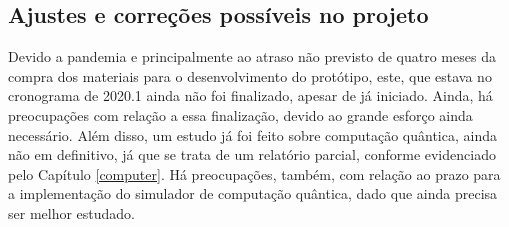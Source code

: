 \subsection{Ajustes e correções possíveis no projeto}
Devido a pandemia e principalmente ao atraso não previsto de quatro meses da compra dos materiais para o desenvolvimento do protótipo, este, que estava no cronograma de 2020.1 ainda não foi finalizado, apesar de já iniciado. Ainda, há preocupações com relação a essa finalização, devido ao grande esforço ainda necessário.
Além disso, um estudo já foi feito sobre computação quântica, ainda não em definitivo, já que se trata de um relatório parcial, conforme evidenciado pelo Capítulo \ref{computer}. Há preocupações, também, com relação ao prazo para a implementação do simulador de computação quântica, dado que ainda precisa ser melhor estudado. 


\newpage
